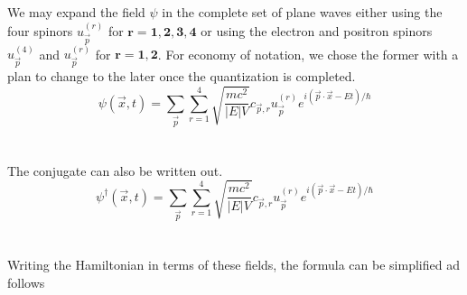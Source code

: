 \documentclass{report}
\begin{document}
\\
\\
We may expand the field $\displaystyle \psi$ in the complete set of plane waves either using the four spinors $\displaystyle u^{\left( r \right) }_{\vec{p}}$ for $\displaystyle \mathbf{r = 1, 2, 3, 4}$ or using the electron and positron spinors $\displaystyle u^{\left( 4 \right) }_{\vec{p}}$ and $\displaystyle u^{\left( r \right) }_{\vec{p}}$ for $\displaystyle \mathbf{r = 1, 2}$. For economy of notation, we chose the former with a plan to change to the later once the quantization is completed.
\begin{equation}
	\psi \left( \vec{x},t \right)  = \sum_{\vec{p}} \sum_{r = 1}^{4} \sqrt{\frac{mc^2}{\left| E \right| V}} c_{\vec{p}, r} u ^{\left( r \right) }_{\vec{p}} e^{i\left( \vec{p} \cdot \vec{x} - Et \right) / \hbar}
\end{equation}
\\
\\
The conjugate can also be written out.
\begin{equation}
	\psi^{\dagger}\left( \vec{x},t \right) = \sum_{\vec{p}} \sum_{r=1}^{4} \sqrt{\frac{mc^2}{\left| E \right| V}} c_{\vec{p},r} u^{\left( r \right) }_{\vec{p}} e^{i\left( \vec{p} \cdot \vec{x} - Et \right) / \hbar}
\end{equation}
\\
\\
Writing the Hamiltonian in terms of these fields, the formula can be simplified ad follows
\end{document}
